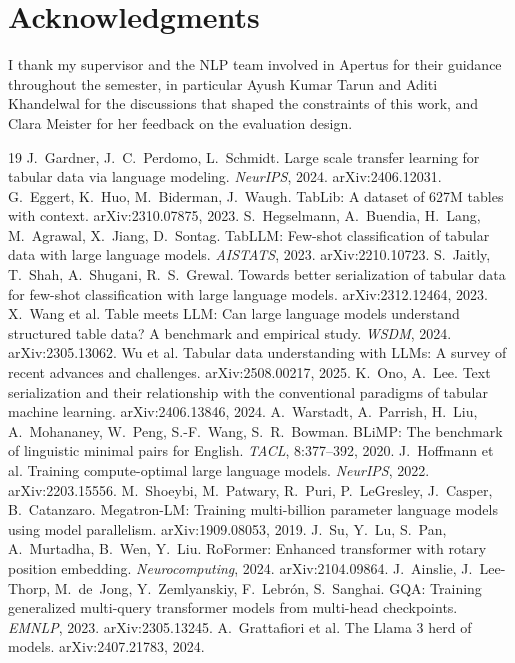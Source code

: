 \documentclass[11pt,a4paper]{article}
\begin{document}
\section*{Acknowledgments}
I thank my supervisor and the NLP team involved in Apertus for their guidance throughout the semester, in particular Ayush Kumar Tarun and Aditi Khandelwal for the discussions that shaped the constraints of this work, and Clara Meister for her feedback on the evaluation design.
\begin{thebibliography}{19}
 J.~Gardner, J.~C.~Perdomo, L.~Schmidt. Large scale transfer learning for tabular data via language modeling. \emph{NeurIPS}, 2024. arXiv:2406.12031.
 G.~Eggert, K.~Huo, M.~Biderman, J.~Waugh. TabLib: A dataset of 627M tables with context. arXiv:2310.07875, 2023.
 S.~Hegselmann, A.~Buendia, H.~Lang, M.~Agrawal, X.~Jiang, D.~Sontag. TabLLM: Few-shot classification of tabular data with large language models. \emph{AISTATS}, 2023. arXiv:2210.10723.
 S.~Jaitly, T.~Shah, A.~Shugani, R.~S.~Grewal. Towards better serialization of tabular data for few-shot classification with large language models. arXiv:2312.12464, 2023.
 X.~Wang et al. Table meets LLM: Can large language models understand structured table data? A benchmark and empirical study. \emph{WSDM}, 2024. arXiv:2305.13062.
 Wu et al. Tabular data understanding with LLMs: A survey of recent advances and challenges. arXiv:2508.00217, 2025.
 K.~Ono, A.~Lee. Text serialization and their relationship with the conventional paradigms of tabular machine learning. arXiv:2406.13846, 2024.
 A.~Warstadt, A.~Parrish, H.~Liu, A.~Mohananey, W.~Peng, S.-F.~Wang, S.~R.~Bowman. BLiMP: The benchmark of linguistic minimal pairs for English. \emph{TACL}, 8:377--392, 2020.
 J.~Hoffmann et al. Training compute-optimal large language models. \emph{NeurIPS}, 2022. arXiv:2203.15556.
 M.~Shoeybi, M.~Patwary, R.~Puri, P.~LeGresley, J.~Casper, B.~Catanzaro. Megatron-LM: Training multi-billion parameter language models using model parallelism. arXiv:1909.08053, 2019.
 J.~Su, Y.~Lu, S.~Pan, A.~Murtadha, B.~Wen, Y.~Liu. RoFormer: Enhanced transformer with rotary position embedding. \emph{Neurocomputing}, 2024. arXiv:2104.09864.
 J.~Ainslie, J.~Lee-Thorp, M.~de~Jong, Y.~Zemlyanskiy, F.~Lebr\'on, S.~Sanghai. GQA: Training generalized multi-query transformer models from multi-head checkpoints. \emph{EMNLP}, 2023. arXiv:2305.13245.
 A.~Grattafiori et al. The Llama 3 herd of models. arXiv:2407.21783, 2024.

\end{thebibliography}
\end{document}
